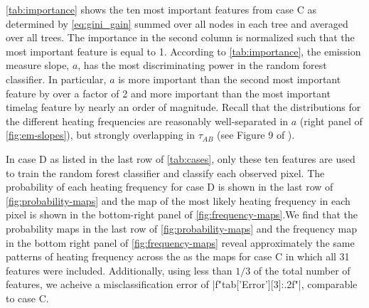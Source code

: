 \autoref{tab:importance} shows the ten most important features from case C as determined by \autoref{eq:gini_gain} summed over all nodes in each tree and averaged over all trees. The importance in the second column is normalized such that the most important feature is equal to 1. According to \autoref{tab:importance}, the emission measure slope, $a$, has the most discriminating power in the random forest classifier. In particular, $a$ is more important than the second most important feature by over a factor of 2 and more important than the most important timelag feature by nearly an order of magnitude. Recall that the distributions for the different heating frequencies are reasonably well-separated in $a$ (right panel of \autoref{fig:em-slopes}), but strongly overlapping in $\tau_{AB}$ (see Figure 9 of ).

In case D as listed in the last row of \autoref{tab:cases}, only these ten features are used to train the random forest classifier and classify each observed pixel. The probability of each heating frequency for case D is shown in the last row of \autoref{fig:probability-maps} and the map of the most likely heating frequency in each pixel is shown in the bottom-right panel of \autoref{fig:frequency-maps}.We find that the probability maps in the last row of \autoref{fig:probability-maps} and the frequency map in the bottom right panel of \autoref{fig:frequency-maps} reveal approximately the same patterns of heating frequency across the \AR{} as the maps for case C in which all 31 features were included. Additionally, using less than $1/3$ of the total number of features, we acheive a misclassification error of \py[manager_ml]|f"{tab['Error'][3]:.2f}"|, comparable to case C.


